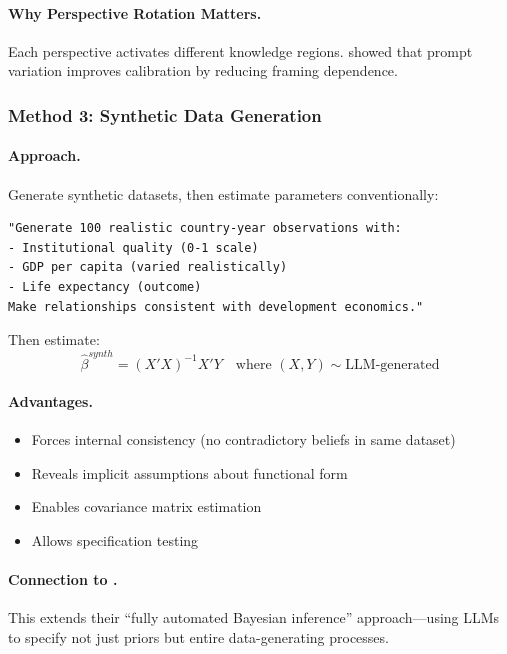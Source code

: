\paragraph{Why Perspective Rotation Matters.}
Each perspective activates different knowledge regions. \citet{nafar2025extracting} showed that prompt variation improves calibration by reducing framing dependence.

\subsubsection{Method 3: Synthetic Data Generation}

\paragraph{Approach.}
Generate synthetic datasets, then estimate parameters conventionally:

\begin{verbatim}
"Generate 100 realistic country-year observations with:
- Institutional quality (0-1 scale)
- GDP per capita (varied realistically)  
- Life expectancy (outcome)
Make relationships consistent with development economics."
\end{verbatim}

Then estimate:
\begin{equation}
\hat{\beta}^{synth} = (X'X)^{-1}X'Y \quad \text{where } (X, Y) \sim \text{LLM-generated}
\end{equation}

\paragraph{Advantages.}
\begin{itemize}
    \item Forces internal consistency (no contradictory beliefs in same dataset)
    \item Reveals implicit assumptions about functional form
    \item Enables covariance matrix estimation
    \item Allows specification testing
\end{itemize}

\paragraph{Connection to \citet{llmbi2025}.}
This extends their ``fully automated Bayesian inference'' approach---using LLMs to specify not just priors but entire data-generating processes.

